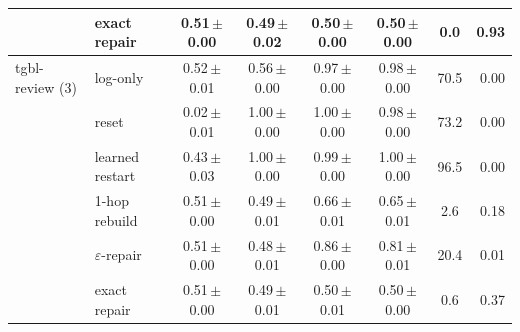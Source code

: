 \begin{table}[!htb]
\begin{tabular}{@{}llcccccr@{}}
 & exact repair & 0.51\,{\scriptsize$\pm$0.00} & 0.49\,{\scriptsize$\pm$0.02} & 0.50\,{\scriptsize$\pm$0.00} & 0.50\,{\scriptsize$\pm$0.00} & 0.0 & 0.93 \\
\midrule
tgbl-review (3) & log-only & 0.52\,{\scriptsize$\pm$0.01} & 0.56\,{\scriptsize$\pm$0.00} & 0.97\,{\scriptsize$\pm$0.00} & 0.98\,{\scriptsize$\pm$0.00} & 70.5 & 0.00 \\
 & reset & 0.02\,{\scriptsize$\pm$0.01} & 1.00\,{\scriptsize$\pm$0.00} & 1.00\,{\scriptsize$\pm$0.00} & 0.98\,{\scriptsize$\pm$0.00} & 73.2 & 0.00 \\
 & learned restart & 0.43\,{\scriptsize$\pm$0.03} & 1.00\,{\scriptsize$\pm$0.00} & 0.99\,{\scriptsize$\pm$0.00} & 1.00\,{\scriptsize$\pm$0.00} & 96.5 & 0.00 \\
 & 1-hop rebuild & 0.51\,{\scriptsize$\pm$0.00} & 0.49\,{\scriptsize$\pm$0.01} & 0.66\,{\scriptsize$\pm$0.01} & 0.65\,{\scriptsize$\pm$0.01} & 2.6 & 0.18 \\
 & $\varepsilon$-repair & 0.51\,{\scriptsize$\pm$0.00} & 0.48\,{\scriptsize$\pm$0.01} & 0.86\,{\scriptsize$\pm$0.00} & 0.81\,{\scriptsize$\pm$0.01} & 20.4 & 0.01 \\
 & exact repair & 0.51\,{\scriptsize$\pm$0.00} & 0.49\,{\scriptsize$\pm$0.01} & 0.50\,{\scriptsize$\pm$0.01} & 0.50\,{\scriptsize$\pm$0.00} & 0.6 & 0.37 \\
\bottomrule
\end{tabular}
\end{table}
